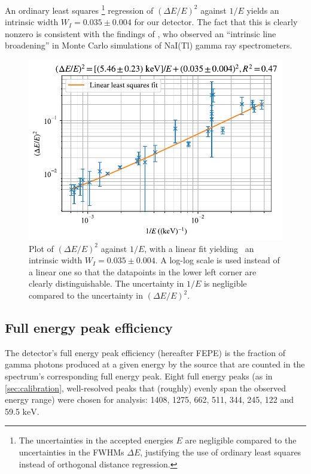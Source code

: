 \documentclass[twocol]{ametsocV6.1}
\begin{document}
An ordinary least squares%
\footnote{The uncertainties in the accepted energies $E$ are negligible
compared to the uncertainties in the FWHMs $\Delta E$, justifying the use
of ordinary least squares instead of orthogonal distance regression.}
regression of $(\Delta E/E)^2$ against
$1/E$ yields an intrinsic width $W_I = 0.035 \pm 0.004$ for our detector.
The fact that this is clearly nonzero is consistent with
the findings of \cite{zerby_1961}, who observed an ``intrinsic line
broadening'' in Monte Carlo simulations of NaI(Tl) gamma ray spectrometers.

\begin{figure}[ht]
	\includegraphics[width=\linewidth]{../figures/resolution.pdf}
	\caption{
		Plot of $(\Delta E/E)^2$ against $1/E$, with a linear fit yielding \
		an intrinsic width $W_I = 0.035 \pm 0.004$.
		A log-log scale is used instead of a linear one so that the
		datapoints in the lower left corner are clearly distinguishable.
		The uncertainty in 
		$1/E$ is negligible compared to the uncertainty in $(\Delta E/E)^2$.
	}
	\label{fig:resolution}
\end{figure}

\subsection{Full energy peak efficiency}
The detector's full energy peak efficiency (hereafter FEPE)
is the fraction of gamma photons
produced at a given energy by the source that are counted in the spectrum's
corresponding full energy peak. Eight full energy peaks
(as in \autoref{sec:calibration}, well-resolved peaks that (roughly) evenly
span the observed energy range) were chosen for analysis: 1408,
1275, 662, 511, 344, 245, 122 and 59.5 $\si{\kilo\electronvolt}$.
\end{document}
